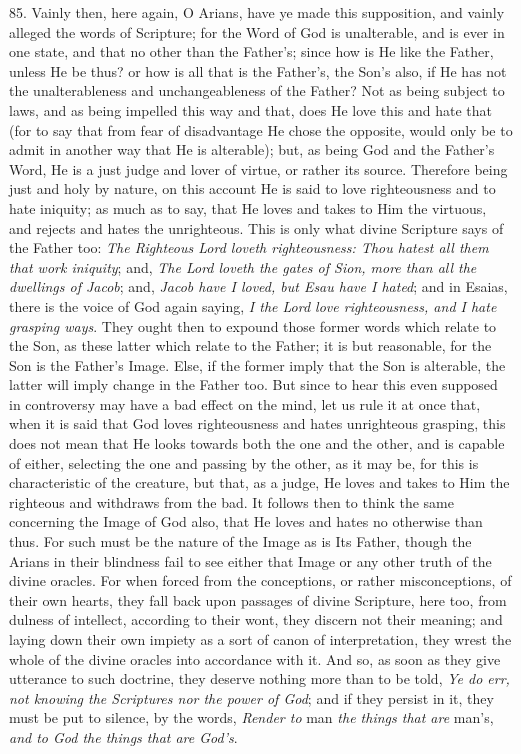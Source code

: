 85. Vainly then, here again, O
Arians, have ye made this supposition, and vainly alleged the words of
Scripture; for the Word of God is unalterable, and is ever in one
state, and that no other than the Father's; since how is He like the
Father, unless He be thus? or how is all that is the Father's, the Son's
also, if He has not the unalterableness and unchangeableness of the
Father? Not as being subject to laws, and as being impelled this way
and that, does He love this and hate that (for to say that from fear
of disadvantage He chose the opposite, would only be to admit in
another way that He is alterable); but, as being God and the Father's
Word, He is a just judge and lover of virtue, or rather its source.
Therefore being just and holy by nature, on this account He is said to
love righteousness and to hate iniquity; as much as to say, that He
loves and takes to Him the virtuous, and rejects and hates the
unrighteous. This is only what divine Scripture says of the Father
too: \emph{The Righteous Lord loveth righteousness: Thou hatest all them
that work iniquity}; and, \emph{The Lord loveth the gates of Sion,
more than all the dwellings of Jacob}; and, \emph{Jacob have I loved,
but Esau have I hated}; and in Esaias, there is the voice of God
again saying, \emph{I the Lord love righteousness, and I hate grasping
ways}. They ought then to expound those former words which relate
to the Son, as these latter which relate to the Father; it is but
reasonable, for the Son is the Father's Image. Else, if the former
imply that the Son is alterable, the latter will imply change in the
Father too. But since to hear this even supposed in controversy may
have a bad effect on the mind, let us rule it at once that, when it is
said that God loves righteousness and hates unrighteous grasping, this
does not mean that He looks towards both the one and the other, and is
capable of either, selecting the one and passing by the other,
as it may be, for this is characteristic of the creature, but that, as
a judge, He loves and takes to Him the righteous and withdraws from
the bad. It follows then to think the same concerning the Image of God
also, that He loves and hates no otherwise than thus. For such must be
the nature of the Image as is Its Father, though the Arians in their
blindness fail to see either that Image or any other truth of the
divine oracles. For when forced from the conceptions, or rather
misconceptions, of their own hearts, they fall back upon passages of
divine Scripture, here too, from dulness of intellect, according to
their wont, they discern not their meaning; and laying down their own
impiety as a sort of canon of interpretation, they wrest the whole of
the divine oracles into accordance with it. And so, as soon as they
give utterance to such doctrine, they deserve nothing more than to be
told, \emph{Ye do err, not knowing the Scriptures nor the power of God};
and if they persist in it, they must be put to silence, by the words, \emph{Render
to} man \emph{the things that are} man's, \emph{and to God the things
that are God's}.

